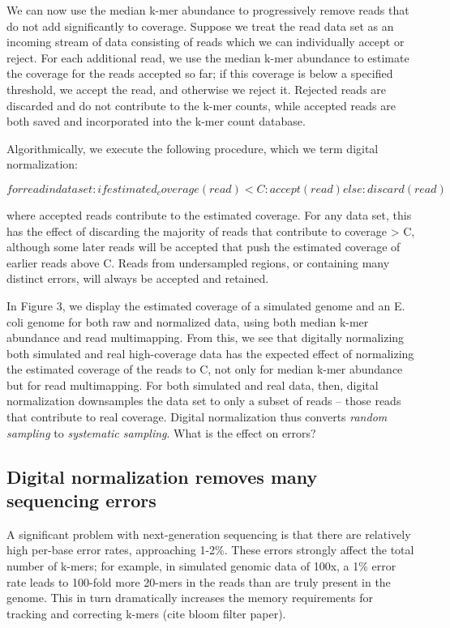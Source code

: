 \documentclass[10pt]{article}
\begin{document}
We can now use the median k-mer abundance to progressively remove
reads that do not add significantly to coverage.  Suppose we treat the
read data set as an incoming stream of data consisting of reads which
we can individually accept or reject.  For each additional read, we
use the median k-mer abundance to estimate the coverage for the reads
accepted so far; if this coverage is below a specified threshold, we
accept the read, and otherwise we reject it.  Rejected reads are
discarded and do not contribute to the k-mer counts, while accepted
reads are both saved and incorporated into the k-mer count database.

Algorithmically, we execute the following procedure, which we term
digital normalization:

\[
   for read in dataset:
      if estimated_coverage(read) < C:
         accept(read)
      else:
         discard(read)
\]

where accepted reads contribute to the estimated coverage.  For any
data set, this has the effect of discarding the majority of reads that
contribute to coverage > C, although some later reads will be accepted
that push the estimated coverage of earlier reads above C.  Reads from
undersampled regions, or containing many distinct errors, will always
be accepted and retained.

In Figure 3, we display the estimated coverage of a simulated genome
and an E. coli genome for both raw and normalized data, using both
median k-mer abundance and read multimapping.  From this, we see that
digitally normalizing both simulated and real high-coverage data has
the expected effect of normalizing the estimated coverage of the reads
to C, not only for median k-mer abundance but for read multimapping.
For both simulated and real data, then, digital normalization
downsamples the data set to only a subset of reads -- those reads that
contribute to real coverage.  Digital normalization thus converts {\em
random sampling} to {\em systematic sampling}.  What is the effect on
errors?

\subsection*{Digital normalization removes many sequencing errors}

A significant problem with next-generation sequencing is that there
are relatively high per-base error rates, approaching 1-2\%.  These
errors strongly affect the total number of k-mers; for example, in
simulated genomic data of 100x, a 1\% error rate leads to 100-fold
more 20-mers in the reads than are truly present in the genome.  This
in turn dramatically increases the memory requirements for tracking
and correcting k-mers (cite bloom filter paper).
\end{document}
